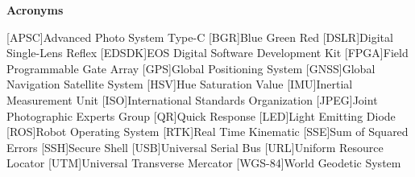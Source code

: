 
\vspace*{0.2cm}
\begin{center}
{\bf \Huge Acronyms}
\end{center}

\begin{acronym}[EDSDK] %

[APSC]{Advanced Photo System Type-C}
[BGR]{Blue Green Red}
[DSLR]{Digital Single-Lens Reflex}
[EDSDK]{EOS Digital Software Development Kit}
[FPGA]{Field Programmable Gate Array}
[GPS]{Global Positioning System}
[GNSS]{Global Navigation Satellite System}
[HSV]{Hue Saturation Value}
[IMU]{Inertial Measurement Unit}
[ISO]{International Standards Organization}
[JPEG]{Joint Photographic Experts Group}
[QR]{Quick Response}
[LED]{Light Emitting Diode}
[ROS]{Robot Operating System}
[RTK]{Real Time Kinematic}
[SSE]{Sum of Squared Errors}
[SSH]{Secure Shell}
[USB]{Universal Serial Bus}
[URL]{Uniform Resource Locator}
[UTM]{Universal Transverse Mercator}
[WGS-84]{World Geodetic System}

\end{acronym}




